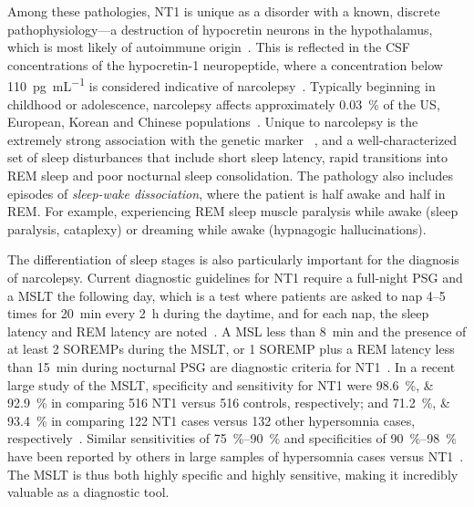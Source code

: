 Among these pathologies, \ac{NT1} is unique as a disorder with a known, discrete pathophysiology---a destruction of hypocretin neurons in the hypothalamus, which is most likely of autoimmune origin~\cite{Peyron2000}.
This is reflected in the \ac{CSF} concentrations of the hypocretin-1 neuropeptide, where a concentration below \SI{110}{\pico\gram\per\milli\liter} is considered indicative of narcolepsy~\cite{AmericanAcademyofSleepMedicine2014}.
Typically beginning in childhood or adolescence, narcolepsy affects approximately \SI{0.03}{\percent} of the US, European, Korean and Chinese populations~\cite{Kornum2017}.
Unique to narcolepsy is the extremely strong association with the genetic marker \hla~\cite{Han2014}, and a well-characterized set of sleep disturbances that include short sleep latency, rapid transitions into \ac{REM} sleep and poor nocturnal sleep consolidation.
The pathology also includes episodes of \textit{sleep-wake dissociation}, where the patient is half awake and half in \ac{REM}.
For example, experiencing REM sleep muscle paralysis while awake (sleep paralysis, cataplexy) or dreaming while awake (hypnagogic hallucinations).

The differentiation of sleep stages is also particularly important for the diagnosis of narcolepsy.
Current diagnostic guidelines for \ac{NT1} require a full-night \ac{PSG} and a \ac{MSLT} the following day, which is a test where patients are asked to nap \numrange{4}{5} times for \SI{20}{\minute} every \SI{2}{\hour} during the daytime, and for each nap, the sleep latency and \ac{REM} latency are noted~\cite{Littner2005}.
A \ac{MSL} less than \SI{8}{\minute} and the presence of at least \num{2} \acp{SOREMP} during the \ac{MSLT}, or \num{1} \ac{SOREMP} plus a \ac{REM} latency less than \SI{15}{\minute} during nocturnal \ac{PSG} are diagnostic criteria for \ac{NT1}~\cite{AmericanAcademyofSleepMedicine2014}.
In a recent large study of the \ac{MSLT}, specificity and sensitivity for \ac{NT1} were \SIlist{98.6;92.9}{\percent} in comparing \num{516} \ac{NT1} versus \num{516} controls, respectively; and \SIlist{71.2;93.4}{\percent} in comparing \num{122} \ac{NT1} cases versus \num{132} other hypersomnia cases, respectively~\cite{Andlauer2013}.
Similar sensitivities of \SIrange{75}{90}{\percent} and specificities of \SIrange{90}{98}{\percent} have been reported by others in large samples of hypersomnia cases versus \ac{NT1}~\cite{Mignot2002,Andlauer2012,Luca2013,Dauvilliers2004,Moscovitch1993}. 
The \ac{MSLT} is thus both highly specific and highly sensitive, making it incredibly valuable as a diagnostic tool. 

